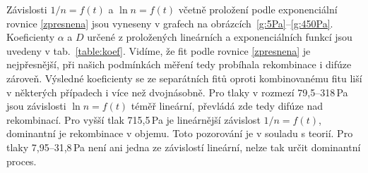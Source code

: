 \documentclass[a4paper,12pt]{article}
\begin{document}
Závislosti $1/n = f(t)$ a $\ln n = f(t)$ včetně proložení podle exponenciální 
rovnice 
\eqref{zpresnena} jsou vyneseny v grafech na obrázcích~\ref{g:5Pa}--\ref{g:450Pa}. 
Koeficienty $\alpha$ a $D$ určené z proložených lineárních a exponenciálních funkcí jsou 
uvedeny v tab.~\ref{table:koef}. Vidíme, že fit podle rovnice 
\ref{zpresnena} je nejpřesnější, při našich podmínkách měření tedy probíhala 
rekombinace i difúze zároveň. Výsledné koeficienty se ze separátních fitů oproti 
kombinovanému fitu liší v některých případech i více než dvojnásobně. Pro 
tlaky v rozmezí 79,5--318\,Pa jsou závislosti $\ln n = f(t)$ téměř lineární, 
převládá zde tedy difúze nad rekombinací. Pro vyšší tlak 715,5\,Pa je lineárnější 
závislost $1/n = f(t)$, dominantní je rekombinace v objemu. Toto pozorování je 
v souladu s teorií. Pro tlaky 7,95--31,8\,Pa není ani jedna ze závislostí lineární, 
nelze tak určit dominantní proces. 
\end{document}
